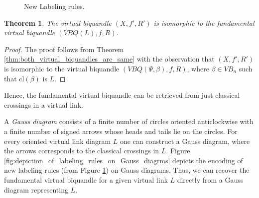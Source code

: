 \documentclass[11pt, reqno]{amsart}
\newtheorem{theorem}{Theorem}[section]
\theoremstyle{definition}
\newcommand{\cl}{\mathrm{cl}}
\begin{document}
\begin{figure}[H]
\caption{New Labeling rules.} \label{fig:new_labeling_virtual_crossing_rules}

\end{figure}


\begin{theorem}\label{thm:virtual_biquandle_isomorphism}
The virtual biquandle $(X,f',R')$ is isomorphic to the fundamental virtual biquandle $(VBQ(L), f, R)$.
\end{theorem}
\begin{proof}
The proof follows from Theorem \ref{thm:both_virtual_biquandles_are_same} with the observation that $(X, f', R')$ is isomorphic to the virtual biquandle $(VBQ(\Psi, \beta),f, R)$, where $\beta \in VB_n$ such that $\cl(\beta)$ is $L$.
\end{proof}

Hence, the fundamental virtual biquandle can be retrieved from just classical crossings in a virtual link.

A {\it Gauss diagram} consists of a finite number of circles oriented anticlockwise with a finite number of
signed arrows whose heads and tails lie on the circles. For every oriented virtual link diagram $L$ one can construct a Gauss diagram, where the arrows corresponds to the classical crossings in $L$. Figure \ref{fig:depiction_of_labeling_rules_on_Gauss_diagrms} depicts the encoding of new labeling rules (from Figure \ref{fig:new_labeling_virtual_crossing_rules}) on Gauss diagrams. Thus, we can recover the fundamental virtual biquandle for a given virtual link $L$ directly from a Gauss diagram representing $L$.
\end{document}
